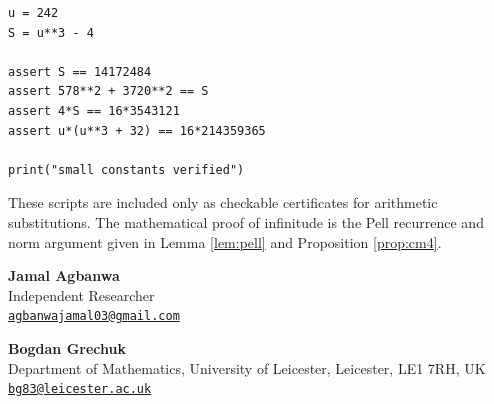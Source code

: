 \documentclass{article}
\theoremstyle{plain}
\theoremstyle{remark}
\theoremstyle{myconjecture}
\theoremstyle{plain}
\theoremstyle{definition}
\numberwithin{equation}{section} %
\begin{document}
\begin{lstlisting}[caption={Exact verification of the constants in Proposition \ref{prop:cm4}.}]
u = 242
S = u**3 - 4

assert S == 14172484
assert 578**2 + 3720**2 == S
assert 4*S == 16*3543121
assert u*(u**3 + 32) == 16*214359365

print("small constants verified")
\end{lstlisting}

These scripts are included only as checkable certificates for arithmetic
substitutions.  The mathematical proof of infinitude is the Pell recurrence and
norm argument given in Lemma \ref{lem:pell} and Proposition \ref{prop:cm4}.




\vspace{2em}

\noindent\textbf{Jamal Agbanwa}\\
Independent Researcher\\
\href{mailto:agbanwajamal03@gmail.com}{\texttt{agbanwajamal03@gmail.com}}

\vspace{1em}

\noindent\textbf{Bogdan Grechuk}\\
Department of Mathematics, University of Leicester, Leicester, LE1 7RH, UK\\
\href{mailto:bg83@leicester.ac.uk}{\texttt{bg83@leicester.ac.uk}}
\end{document}
